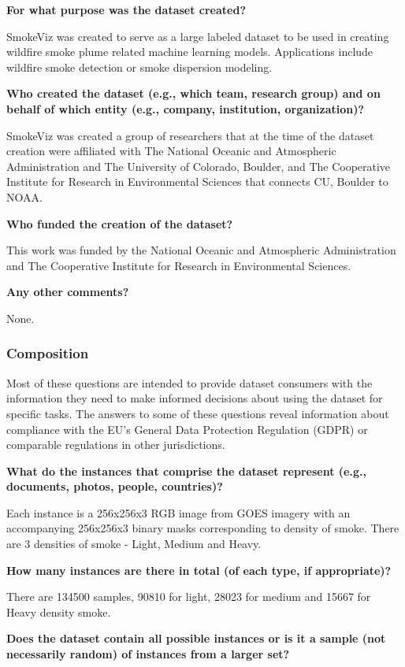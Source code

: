 \documentclass{article}
\begin{document}
\textbf{For what purpose was the dataset created? }

SmokeViz was created to serve as a large labeled dataset to be used in creating wildfire smoke plume related machine learning models. Applications include wildfire smoke detection or smoke dispersion modeling.

\textbf{Who created the dataset (e.g., which team, research group) and on behalf of which entity (e.g., company, institution, organization)?}

SmokeViz was created a group of researchers that at the time of the dataset creation were affiliated with The National Oceanic and Atmospheric Administration and The University of Colorado, Boulder, and The Cooperative Institute for Research in Environmental Sciences that connects CU, Boulder to NOAA. 


\textbf{Who funded the creation of the dataset?} 

This work was funded by the National Oceanic and Atmospheric Administration and The Cooperative Institute for Research in Environmental Sciences.

\textbf{Any other comments?}

None.

\subsubsection{Composition}

Most of these questions are intended to provide dataset consumers with the information they need to make informed decisions about using the dataset for specific tasks. The answers to some of these questions reveal information about compliance with the EU’s General Data Protection Regulation (GDPR) or comparable regulations in other jurisdictions.

\textbf{What do the instances that comprise the dataset represent (e.g., documents, photos, people, countries)?}

Each instance is a 256x256x3 RGB image from GOES imagery with an accompanying 256x256x3 binary masks corresponding to density of smoke. There are 3 densities of smoke - Light, Medium and Heavy.


\textbf{How many instances are there in total (of each type, if appropriate)?} 

There are 134500 samples,  90810 for light, 28023 for medium and 15667 for Heavy density smoke.


\textbf{Does the dataset contain all possible instances or is it a sample (not necessarily random) of instances from a larger set? }
\end{document}
